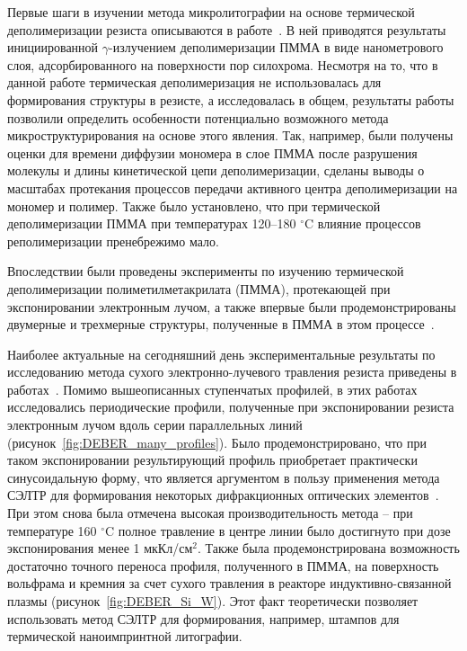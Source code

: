 \previouswork

Первые шаги в изучении метода микролитографии на основе термической деполимеризации резиста описываются в работе~\cite{Bruk_2000}. В ней приводятся результаты инициированной $\gamma$-излучением деполимеризации ПММА в виде нанометрового слоя, адсорбированного на поверхности пор силохрома. Несмотря на то, что в данной работе термическая деполимеризация не использовалась для формирования структуры в резисте, а исследовалась в общем, результаты работы позволили определить особенности потенциально возможного метода микроструктурирования на основе этого явления. Так, например, были получены оценки для времени диффузии мономера в слое ПММА после разрушения молекулы и длины кинетической цепи деполимеризации, сделаны выводы о масштабах протекания процессов передачи активного центра деполимеризации на мономер и полимер. Также было установлено, что при термической деполимеризации ПММА при температурах 120--180 $^\circ$C влияние процессов реполимеризации пренебрежимо мало.

Впоследствии были проведены эксперименты по изучению термической деполимеризации полиметилметакрилата (ПММА), протекающей при экспонировании электронным лучом, а также впервые были продемонстрированы двумерные и трехмерные структуры, полученные в ПММА в этом процессе~\cite{Bruk_2013}.

Наиболее актуальные на сегодняшний день экспериментальные результаты по исследованию метода сухого электронно-лучевого травления резиста приведены в работах~\cite{Bruk_2015_co, Bruk_2016_mee}. Помимо вышеописанных ступенчатых профилей, в этих работах исследовались периодические профили, полученные при экспонировании резиста электронным лучом вдоль серии параллельных линий (рисунок~\ref{fig:DEBER_many_profiles}). Было продемонстрировано, что при таком экспонировании результирующий профиль приобретает практически синусоидальную форму, что является аргументом в пользу применения метода СЭЛТР для формирования некоторых дифракционных оптических элементов~\cite{Mitreska_sin_gratings}. При этом снова была отмечена высокая производительность метода -- при температуре 160 $^\circ$C полное травление в центре линии было достигнуто при дозе экспонирования менее 1 мкКл/см$^2$. Также была продемонстрирована возможность достаточно точного переноса профиля, полученного в ПММА, на поверхность вольфрама и кремния за счет сухого травления в реакторе индуктивно-связанной плазмы (рисунок~\ref{fig:DEBER_Si_W}). Этот факт теоретически позволяет использовать метод СЭЛТР для формирования, например, штампов для термической наноимпринтной литографии.


